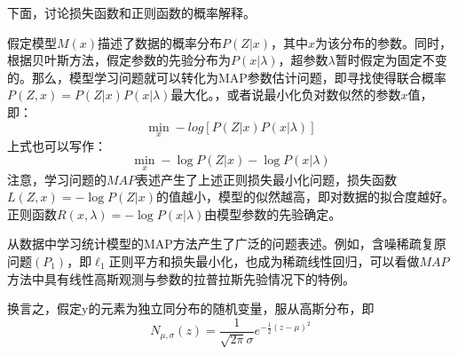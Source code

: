 {\heiti 下面，讨论损失函数和正则函数的概率解释。}

假定模型$ M(x) $描述了数据的概率分布$ P(Z|x) $，其中$ x $为该分布的参数。同时，根据贝叶斯方法，假定参数的先验分布为$ P(x|\lambda) $，超参数$ \lambda $暂时假定为固定不变的。那么，模型学习问题就可以转化为MAP参数估计问题，即寻找使得联合概率$ P(Z,x)=P(Z|x)P(x|\lambda) $最大化。，或者说最小化负对数似然的参数$ x $值，即：
\begin{equation}\label{key}
\min_{x} -log\left [P(Z|x)P(x|\lambda)\right ]
\end{equation}
上式也可以写作：
\begin{equation}\label{key}
\min_{x} -\log P(Z|x) - \log P(x|\lambda)
\end{equation}
注意，学习问题的$ MAP $表述产生了上述正则损失最小化问题，损失函数$ L(Z,x)=-\log P(Z|x) $的值越小，模型的似然越高，即对数据的拟合度越好。正则函数$ R(x,\lambda)=-\log P(x|\lambda) $由模型参数的先验确定。



从数据中学习统计模型的MAP方法产生了广泛的问题表述。例如，含噪稀疏复原问题$ (P_1) $，即$ \ell_1$正则平方和损失最小化，也成为稀疏线性回归，可以看做$ MAP $方法中具有线性高斯观测与参数的拉普拉斯先验情况下的特例。

换言之，假定y的元素为独立同分布的随机变量，服从高斯分布，即
\begin{equation}\label{key}
N_{\mu,\sigma}(z)=\dfrac{1}{\sqrt{2\pi }\sigma}e^{-\frac{1}{2}(z-\mu)^2}
\end{equation}



























